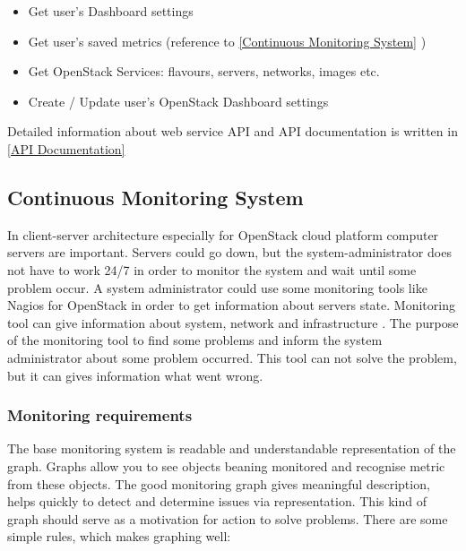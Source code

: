 \begin{itemize}
\item Get user's Dashboard settings
\item Get user's saved metrics (reference to \autoref{Continuous Monitoring System} )
\item Get OpenStack Services: flavours, servers, networks, images etc.
\item Create / Update user's OpenStack Dashboard settings
\end{itemize}

Detailed information about web service API and API documentation is written in \autoref{API Documentation}


\subsection{Continuous Monitoring System}\label{Continuous Monitoring System}

In client-server architecture especially for OpenStack cloud platform computer servers are important. Servers could go down, but the system-administrator does not have to work 24/7 in order to monitor the system and wait until some problem occur. A system administrator could use some monitoring tools like Nagios for OpenStack in order to get information about servers state. Monitoring tool can give information about system, network and infrastructure \cite{nagios}. The purpose of the monitoring tool to find some problems and inform the system administrator about some problem occurred. This tool can not solve the problem, but it can gives information what went wrong.
 
\subsubsection{Monitoring requirements}\label{Monitoring requirements}

The base monitoring system is readable and understandable representation of the graph. Graphs allow you to see objects beaning monitored and recognise metric from these objects. 
The good monitoring graph gives meaningful description, helps quickly to detect and determine issues via representation. This kind of graph should serve as a motivation for action to solve problems. 
There are some simple rules, which makes graphing well:

